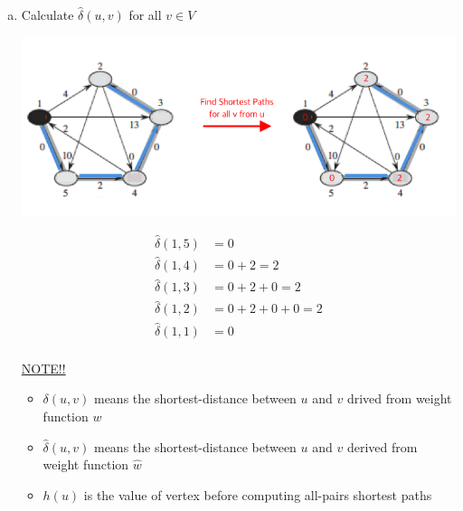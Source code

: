 \documentclass[12pt]{article}
\begin{document}
\begin{enumerate}[1.]
\begin{itemize}
\begin{enumerate}[1.]
\begin{enumerate}[a)]
                \item Calculate $\hat{\delta}(u,v)$ for all $v \in V$

                \begin{center}
                \includegraphics[width=\linewidth]{images/worksheet_4_solution_61.png}
                \end{center}

                \bigskip

                \begin{align*}
                    \hat{\delta}(1,5) &= 0\\
                    \hat{\delta}(1,4) &= 0 + 2 = 2\\
                    \hat{\delta}(1,3) &= 0 + 2 + 0 = 2\\
                    \hat{\delta}(1,2) &= 0 + 2 + 0 + 0 = 2\\
                    \hat{\delta}(1,1) &= 0\\
                \end{align*}

                \bigskip

                \underline{NOTE!!}

                \bigskip

                \begin{itemize}
                    \item $\delta(u,v)$ means the shortest-distance between $u$ and $v$ drived from weight function $w$
                    \item $\hat{\delta}(u,v)$ means the shortest-distance between $u$ and $v$ derived from weight function $\hat{w}$
                    \item $h(u)$ is the value of vertex before computing all-pairs shortest paths


\end{itemize}
\end{enumerate}
\end{enumerate}
\end{itemize}
\end{enumerate}
\end{document}
